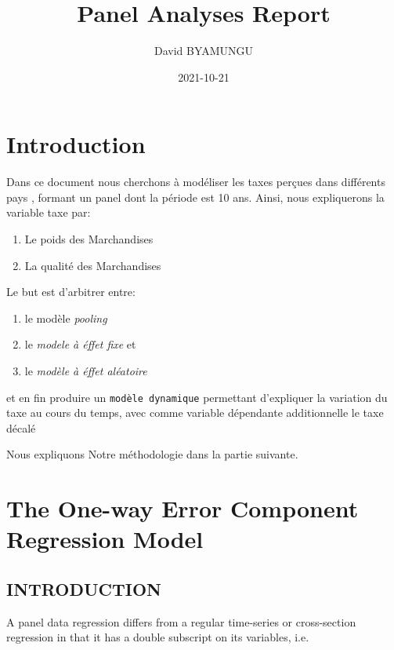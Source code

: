 \documentclass[
]{book}
\title{Panel Analyses Report}
\author{David BYAMUNGU}
\date{2021-10-21}
\providecommand{\tightlist}{%
  \setlength{\itemsep}{0pt}\setlength{\parskip}{0pt}}
\begin{document}
\maketitle

{
\setcounter{tocdepth}{1}
\tableofcontents
}
\hypertarget{intro}{%
\chapter{Introduction}\label{intro}}

Dans ce document nous cherchons à modéliser les taxes perçues dans différents pays , formant un panel dont la période est 10 ans.
Ainsi, nous expliquerons la variable taxe par:

\begin{enumerate}
\def\labelenumi{(\arabic{enumi})}
\tightlist
\item
  Le poids des Marchandises
\item
  La qualité des Marchandises
\end{enumerate}

Le but est d'arbitrer entre:

\begin{enumerate}
\def\labelenumi{(\arabic{enumi})}
\tightlist
\item
  le modèle \emph{pooling}
\item
  le \emph{modele à éffet fixe} et
\item
  le \emph{modèle à éffet aléatoire}
\end{enumerate}

et en fin produire un \texttt{modèle\ dynamique} permettant d'expliquer la variation du taxe au cours du temps, avec comme variable dépendante additionnelle le taxe décalé

Nous expliquons Notre méthodologie dans la partie suivante.

\hypertarget{the-one-way-error-component-regression-model}{%
\chapter{The One-way Error Component Regression Model}\label{the-one-way-error-component-regression-model}}

\hypertarget{introduction}{%
\section{INTRODUCTION}\label{introduction}}

A panel data regression differs from a regular time-series or cross-section regression in that it has a double subscript on its variables, i.e.
\end{document}
